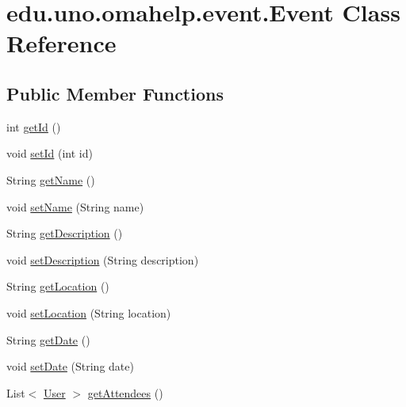 \hypertarget{classedu_1_1uno_1_1omahelp_1_1event_1_1_event}{}\section{edu.\+uno.\+omahelp.\+event.\+Event Class Reference}
\label{classedu_1_1uno_1_1omahelp_1_1event_1_1_event}
\subsection*{Public Member Functions}
\begin{DoxyCompactItemize}
\item 
int \mbox{\hyperlink{classedu_1_1uno_1_1omahelp_1_1event_1_1_event_a12880cf4efe7977b164b79c6b2452783}{get\+Id}} ()
\item 
void \mbox{\hyperlink{classedu_1_1uno_1_1omahelp_1_1event_1_1_event_aebc99e68661ca175beb01439a65a1638}{set\+Id}} (int id)
\item 
String \mbox{\hyperlink{classedu_1_1uno_1_1omahelp_1_1event_1_1_event_a8e0a4e313ebd5f0a3279810b2cde8f17}{get\+Name}} ()
\item 
void \mbox{\hyperlink{classedu_1_1uno_1_1omahelp_1_1event_1_1_event_a9b823a7d3e19509e9c354a36ac977133}{set\+Name}} (String name)
\item 
String \mbox{\hyperlink{classedu_1_1uno_1_1omahelp_1_1event_1_1_event_a46c86b7f22f97ada82fb3269df3a7315}{get\+Description}} ()
\item 
void \mbox{\hyperlink{classedu_1_1uno_1_1omahelp_1_1event_1_1_event_ad134a919e9b55383de7de2ae473a79ea}{set\+Description}} (String description)
\item 
String \mbox{\hyperlink{classedu_1_1uno_1_1omahelp_1_1event_1_1_event_a58e699db30788b80eaea50c0edf0a9dd}{get\+Location}} ()
\item 
void \mbox{\hyperlink{classedu_1_1uno_1_1omahelp_1_1event_1_1_event_a32c47b2f1a63f116ba2b3ee164c0920c}{set\+Location}} (String location)
\item 
String \mbox{\hyperlink{classedu_1_1uno_1_1omahelp_1_1event_1_1_event_ad878c65e3b52872b7dd07b79206ddfca}{get\+Date}} ()
\item 
void \mbox{\hyperlink{classedu_1_1uno_1_1omahelp_1_1event_1_1_event_a054a2a51f266b0db935727c39e9d1b9c}{set\+Date}} (String date)
\item 
List$<$ \mbox{\hyperlink{classedu_1_1uno_1_1omahelp_1_1user_1_1_user}{User}} $>$ \mbox{\hyperlink{classedu_1_1uno_1_1omahelp_1_1event_1_1_event_aaffa1cd5d627632d9e68ab2a481183dc}{get\+Attendees}} ()

\end{DoxyCompactItemize}
